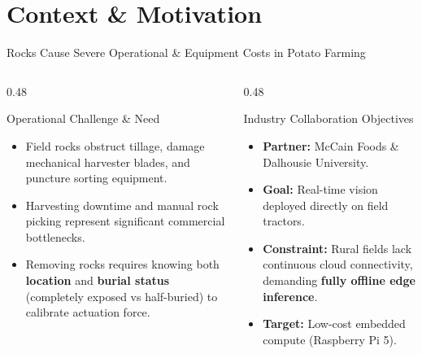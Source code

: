 \documentclass[aspectratio=169,10pt]{beamer}
\begin{document}
\section{Context \& Motivation}
\begin{frame}{Rocks Cause Severe Operational \& Equipment Costs in Potato Farming}
\begin{columns}[T]
  \begin{column}{0.48\textwidth}
    \begin{block}{\small Operational Challenge \& Need}
      \small
      \begin{itemize}
        \item Field rocks obstruct tillage, damage mechanical harvester blades, and puncture sorting equipment.
        \item Harvesting downtime and manual rock picking represent significant commercial bottlenecks.
        \item Removing rocks requires knowing both \textbf{location} and \textbf{burial status} (completely exposed vs half-buried) to calibrate actuation force.
      \end{itemize}
    \end{block}
  \end{column}
  \begin{column}{0.48\textwidth}
    \begin{block}{\small Industry Collaboration Objectives}
      \small
      \begin{itemize}
        \item \textbf{Partner:} McCain Foods \& Dalhousie University.
        \item \textbf{Goal:} Real-time vision deployed directly on field tractors.
        \item \textbf{Constraint:} Rural fields lack continuous cloud connectivity, demanding \textbf{fully offline edge inference}.
        \item \textbf{Target:} Low-cost embedded compute (Raspberry Pi 5).
      \end{itemize}
    \end{block}
  \end{column}
\end{columns}
\end{frame}
\end{document}
